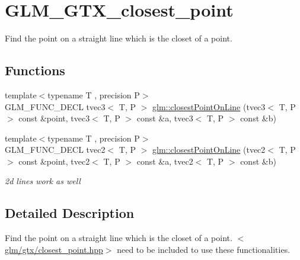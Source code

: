 \hypertarget{group__gtx__closest__point}{\section{G\-L\-M\-\_\-\-G\-T\-X\-\_\-closest\-\_\-point}
\label{group__gtx__closest__point}
}


Find the point on a straight line which is the closet of a point.  


\subsection*{Functions}
\begin{DoxyCompactItemize}
\item 
{\footnotesize template$<$typename T , precision P$>$ }\\G\-L\-M\-\_\-\-F\-U\-N\-C\-\_\-\-D\-E\-C\-L tvec3$<$ T, P $>$ \hyperlink{group__gtx__closest__point_gac26353282a8213e469f5e33560c1200f}{glm\-::closest\-Point\-On\-Line} (tvec3$<$ T, P $>$ const \&point, tvec3$<$ T, P $>$ const \&a, tvec3$<$ T, P $>$ const \&b)
\item 
\hypertarget{group__gtx__closest__point_gadc7010070bb0cacd284f560299b21660}{{\footnotesize template$<$typename T , precision P$>$ }\\G\-L\-M\-\_\-\-F\-U\-N\-C\-\_\-\-D\-E\-C\-L tvec2$<$ T, P $>$ \hyperlink{group__gtx__closest__point_gadc7010070bb0cacd284f560299b21660}{glm\-::closest\-Point\-On\-Line} (tvec2$<$ T, P $>$ const \&point, tvec2$<$ T, P $>$ const \&a, tvec2$<$ T, P $>$ const \&b)}\label{group__gtx__closest__point_gadc7010070bb0cacd284f560299b21660}

\begin{DoxyCompactList}\small\item\em 2d lines work as well \end{DoxyCompactList}\end{DoxyCompactItemize}


\subsection{Detailed Description}
Find the point on a straight line which is the closet of a point. $<$\hyperlink{closest__point_8hpp}{glm/gtx/closest\-\_\-point.\-hpp}$>$ need to be included to use these functionalities. 


